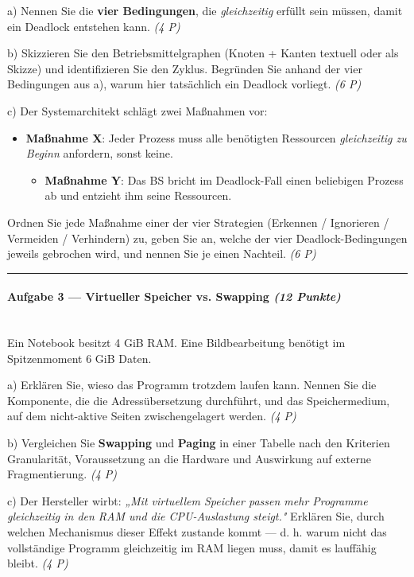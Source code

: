 \documentclass[11pt, a4paper]{article}
\begin{document}
a) Nennen Sie die \textbf{vier Bedingungen}, die \textit{gleichzeitig} erfüllt sein müssen, damit ein Deadlock entstehen kann. \textit{(4 P)}


b) Skizzieren Sie den Betriebsmittelgraphen (Knoten + Kanten textuell oder als Skizze) und identifizieren Sie den Zyklus. Begründen Sie anhand der vier Bedingungen aus a), warum hier tatsächlich ein Deadlock vorliegt. \textit{(6 P)}


c) Der Systemarchitekt schlägt zwei Maßnahmen vor:

\begin{itemize}
  \item \textbf{Maßnahme X}: Jeder Prozess muss alle benötigten Ressourcen \textit{gleichzeitig zu Beginn} anfordern, sonst keine.
\begin{itemize}
  \item \textbf{Maßnahme Y}: Das BS bricht im Deadlock-Fall einen beliebigen Prozess ab und entzieht ihm seine Ressourcen.
\end{itemize}
\end{itemize}

Ordnen Sie jede Maßnahme einer der vier Strategien (Erkennen / Ignorieren / Vermeiden / Verhindern) zu, geben Sie an, welche der vier Deadlock-Bedingungen jeweils gebrochen wird, und nennen Sie je einen Nachteil. \textit{(6 P)}



\noindent\textcolor{rulegray}{\rule{\linewidth}{0.4pt}}


\paragraph{Aufgabe 3 — Virtueller Speicher vs. Swapping \textit{(12 Punkte)}}\mbox{}\\[2pt]

Ein Notebook besitzt 4 GiB RAM. Eine Bildbearbeitung benötigt im Spitzenmoment 6 GiB Daten.


a) Erklären Sie, wieso das Programm trotzdem laufen kann. Nennen Sie die Komponente, die die Adressübersetzung durchführt, und das Speichermedium, auf dem nicht-aktive Seiten zwischengelagert werden. \textit{(4 P)}


b) Vergleichen Sie \textbf{Swapping} und \textbf{Paging} in einer Tabelle nach den Kriterien Granularität, Voraussetzung an die Hardware und Auswirkung auf externe Fragmentierung. \textit{(4 P)}


c) Der Hersteller wirbt: \textit{„Mit virtuellem Speicher passen mehr Programme gleichzeitig in den RAM und die CPU-Auslastung steigt."} Erklären Sie, durch welchen Mechanismus dieser Effekt zustande kommt — d. h. warum nicht das vollständige Programm gleichzeitig im RAM liegen muss, damit es lauffähig bleibt. \textit{(4 P)}
\end{document}
